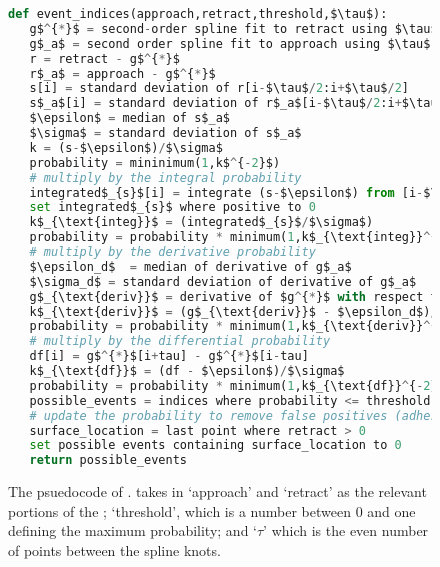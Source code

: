 \begin{figure}[htp]
\caption[\name{} psuedocode]{\noindent{} The psuedocode of \name{}. \name{} takes in `approach' and `retract' as the relevant portions of the \fec{}; `threshold', which is a number between 0 and one defining the maximum probability; and `$\tau$' which is the even number of points between the spline knots.  }
  \begin{lstlisting}[language=Python]
def event_indices(approach,retract,threshold,$\tau$):
   g$^{*}$ = second-order spline fit to retract using $\tau$ for knots
   g$_a$ = second order spline fit to approach using $\tau$ for knots
   r = retract - g$^{*}$
   r$_a$ = approach - g$^{*}$
   s[i] = standard deviation of r[i-$\tau$/2:i+$\tau$/2]
   s$_a$[i] = standard deviation of r$_a$[i-$\tau$/2:i+$\tau$/2]
   $\epsilon$ = median of s$_a$
   $\sigma$ = standard deviation of s$_a$
   k = (s-$\epsilon$)/$\sigma$
   probability = mininimum(1,k$^{-2}$)
   # multiply by the integral probability 
   integrated$_{s}$[i] = integrate (s-$\epsilon$) from [i-$\tau$] to [i+$\tau$]
   set integrated$_{s}$ where positive to 0
   k$_{\text{integ}}$ = (integrated$_{s}$/$\sigma$)
   probability = probability * minimum(1,k$_{\text{integ}}^{-2}$)
   # multiply by the derivative probability
   $\epsilon_d$  = median of derivative of g$_a$
   $\sigma_d$ = standard deviation of derivative of g$_a$
   g$_{\text{deriv}}$ = derivative of $g^{*}$ with respect to time
   k$_{\text{deriv}}$ = (g$_{\text{deriv}}$ - $\epsilon_d$)/$\sigma_d$
   probability = probability * minimum(1,k$_{\text{deriv}}^{-2}$)
   # multiply by the differential probability 
   df[i] = g$^{*}$[i+tau] - g$^{*}$[i-tau]
   k$_{\text{df}}$ = (df - $\epsilon$)/$\sigma$
   probability = probability * minimum(1,k$_{\text{df}}^{-2}$)
   possible_events = indices where probability <= threshold
   # update the probability to remove false positives (adhesions)
   surface_location = last point where retract > 0
   set possible events containing surface_location to 0
   return possible_events
\end{lstlisting}
\end{figure}



